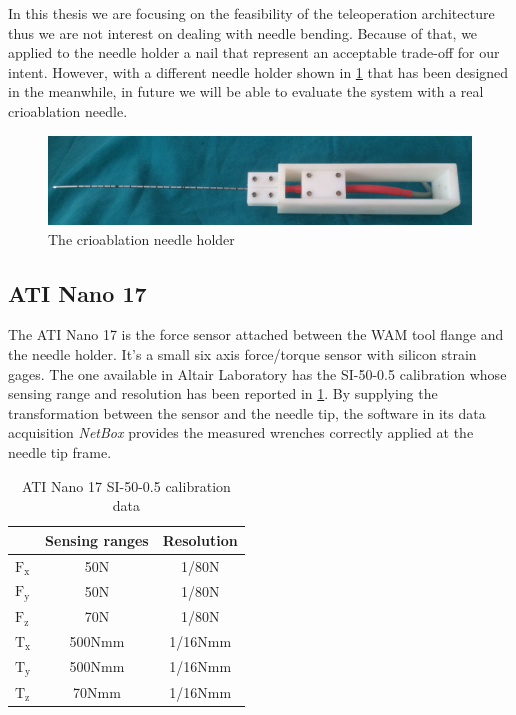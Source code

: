 In this thesis we are focusing on the feasibility of the teleoperation architecture thus we are not interest on dealing with needle bending. Because of that, we applied to the needle holder a nail that represent an acceptable trade-off for our intent.
However, with a different needle holder shown in \figurename{ \ref{fig:New_holder}} that has been designed in the meanwhile, in future we will be able to evaluate the system with a real crioablation needle.
\begin{figure}
	\includegraphics[width=\linewidth]{images/new_assembly.jpeg}
	\caption[The crioablation needle holder]{The crioablation needle holder}
	\label{fig:New_holder}
\end{figure}

\subsection{ATI Nano 17}
The ATI Nano 17 is the force sensor attached between the WAM tool flange and the needle holder.
It's a small six axis force/torque sensor with silicon strain gages.
The one available in Altair Laboratory has the SI-50-0.5 calibration whose sensing range and resolution has been reported in \tablename{ \ref{Nano_calib}}.
By supplying the transformation between the sensor and the needle tip, the software in its data acquisition \textit{NetBox} provides the measured wrenches correctly applied at the needle tip frame.

\begin{table} 
	\centering
	\begin{tabular}{lcc}
		\toprule
		& Sensing ranges  & Resolution\\
		\midrule
		$\mathrm{F_{x}}$& 50N & 1/80N\\
		$\mathrm{F_{y}}$& 50N & 1/80N\\
		$\mathrm{F_{z}}$& 70N & 1/80N\\
		\midrule
		$\mathrm{T_{x}}$& 500Nmm & 1/16Nmm\\
		$\mathrm{T_{y}}$& 500Nmm & 1/16Nmm\\
		$\mathrm{T_{z}}$& 70Nmm & 1/16Nmm\\
		\bottomrule
	\end{tabular}
	\caption[ATI Nano 17 calibration]{ATI Nano 17 SI-50-0.5 calibration data}
	\label{Nano_calib}
\end{table}

